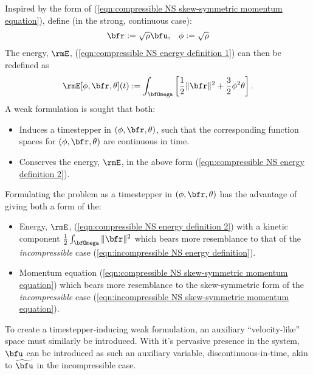     Inspired by the form of (\ref{eqn:compressible NS skew-symmetric momentum equation}), define (in the strong, continuous case):
    \begin{align}
        \bfr  :=  \sqrt{\rho}\bfu,  &&
        \phi  :=  \sqrt{\rho}
    \end{align}
    The energy, $\rmE$, (\ref{eqn:compressible NS energy definition 1}) can then be redefined as
    \begin{equation}\label{eqn:compressible NS energy definition 2}
        \rmE[\phi, \bfr, \theta](t)  :=  \int_{\bfOmega}\left[\frac{1}{2}\|\bfr\|^{2} + \frac{3}{2}\phi^{2}\theta\right].
    \end{equation}
    A weak formulation is sought that both:
    \begin{itemize}
        \item  Induces a timestepper in $(\phi, \bfr, \theta)$, such that the corresponding function spaces for $(\phi, \bfr, \theta)$ are continuous in time.
        \item  Conserves the energy, $\rmE$, in the above form (\ref{eqn:compressible NS energy definition 2}).
    \end{itemize}
    Formulating the problem as a timestepper in $(\phi, \bfr, \theta)$ has the advantage of giving both a form of the:
    \begin{itemize}
        \item  Energy, $\rmE$, (\ref{eqn:compressible NS energy definition 2}) with a kinetic component $\frac{1}{2}\int_{\bfOmega}\|\bfr\|^{2}$ which bears more resemblance to that of the \emph{incompressible} case (\ref{eqn:incompressible NS energy definition}).
        \item  Momentum equation (\ref{eqn:compressible NS skew-symmetric momentum equation}) which bears more resemblance to the skew-symmetric form of the \emph{incompressible} case (\ref{eqn:incompressible NS skew-symmetric momentum equation}).
    \end{itemize}
    
    To create a timestepper-inducing weak formulation, an auxiliary ``velocity-like'' space must similarly be introduced. With it's pervasive presence in the system, $\bfu$ can be introduced as such an auxiliary variable, discontinuous-in-time, akin to $\widetilde{\bfu}$ in the incompressible case.
    
